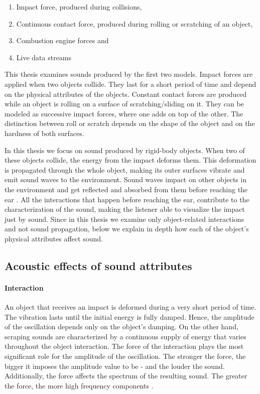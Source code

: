 \begin{enumerate}
\item Impact force, produced during collisions,
\item Continuous contact force, produced during rolling or scratching of an object,
\item Combustion engine forces and
\item Live data streams
\end{enumerate}

This thesis examines sounds produced by the first two models. Impact forces are applied when two objects collide. They last for a short period of time and depend on the physical attributes of the objects. Constant contact forces are produced while an object is rolling on a surface of scratching/sliding on it. They can be modeled as successive impact forces, where one adds on top of the other. The distinction between roll or scratch depends on the shape of the object and on the hardness of both surfaces.

In this thesis we focus on sound produced by rigid-body objects. When two of these objects collide, the energy from the impact deforms them. This deformation is propagated through the whole object, making its outer surfaces vibrate and emit sound waves to the environment. Sound waves impact on other objects in the environment and get reflected and absorbed from them before reaching the ear \cite{van1998sounds}. All the interactions that happen before reaching the ear, contribute to the characterization of the sound, making the listener able to visualize the impact just by sound. Since in this thesis we examine only object-related interactions and not sound propagation, below we explain in depth how each of the object's physical attributes affect sound.


\subsection{Acoustic effects of sound attributes}\label{sec:attributes}

\paragraph{Interaction\\}
An object that receives an impact is deformed during a very short period of time. The vibration lasts until the initial energy is fully damped. Hence, the amplitude of the oscillation depends only on the object's damping. On the other hand, scraping sounds are characterized by a continuous supply of energy that varies throughout the object interaction. The force of the interaction plays the most significant role for the amplitude of the oscillation. The stronger the force, the bigger it imposes the amplitude value to be - and the louder the sound. Additionally, the force affects the spectrum of the resulting sound. The greater the force, the more high frequency components \cite{gaver1993world}.

